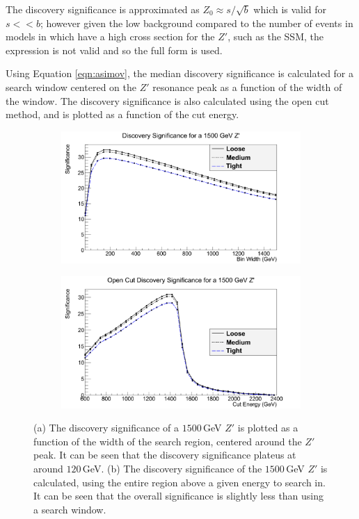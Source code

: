 \documentclass{article}
\begin{document}
The discovery significance is approximated as $Z_0\approx s/\sqrt{b}$ which is valid for $s<<b$; however given the low background compared to the number of events in models in which have a high cross section for the $Z'$, such as the SSM, the expression is not valid and so the full form is used.

Using Equation \ref{eqn:asimov}, the median discovery significance is calculated for a search window centered on the $Z'$ resonance peak as a function of the width of the window. The discovery significance is also calculated using the open cut method, and is plotted as a function of the cut energy.

\begin{figure}[htb]
    \centering
    \begin{subfigure}{.49\textwidth}
        \includegraphics[height=0.6\textwidth]{images/DS1500.png}
        \caption{}
        \label{fig:DS1500}
    \end{subfigure}	
    \begin{subfigure}{.49\textwidth}
        \includegraphics[height=0.6\textwidth]{images/IDS1500.png}
        \caption{}
        \label{fig:IDS1500}
    \end{subfigure}
    \caption{ (a) The discovery significance of a $1500\,$GeV $Z'$ is plotted as a function of the width of the search region, centered around the $Z'$ peak. It can be seen that the discovery significance plateus at around $120\,$GeV. (b) The discovery significance of the $1500\,$GeV $Z'$ is calculated, using the entire region above a given energy to search in. It can be seen that the overall significance is slightly less than using a search window. \label{fig:DiscoverySignificance}}
\end{figure}
\end{document}
